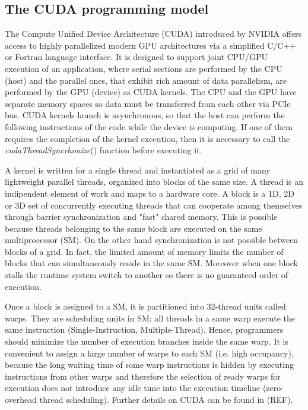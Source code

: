 \documentclass[11pt]{article}
\begin{document}
\subsection{The CUDA programming model}

The Compute Unified Device Architecture (CUDA) introduced by NVIDIA offers access to highly parallelized modern GPU architectures via a simplified C/C++ or Fortran language interface. It is designed to support joint CPU/GPU execution of an application, where serial sections are performed by the CPU (host) and the parallel ones, that exhibit rich amount of data parallelism, are performed by the GPU (device) as CUDA kernels. The CPU and the GPU have separate memory spaces so data must be transferred from each other via PCIe bus. CUDA kernels launch is asynchronous, so that the host can perform the following instructions of the code while the device is computing. If one of them requires the completion of the kernel execution, then it is necessary to call the \textit{cudaThreadSyncrhonize}() function before executing it. 

A kernel is written for a single thread and instantiated as a grid of many lightweight parallel threads, organized into blocks of the same size. 
A thread is an indipendent element of work and maps to a hardware core. A block is a 1D, 2D or 3D set of concurrently executing threads that can cooperate among themselves through barrier synchronization and "fast" shared memory. This is possible because threads belonging to the same block are executed on the same multiprocessor (SM). On the other hand synchronization is not possible between blocks of a grid. In fact, the limited amount of memory limits the number of blocks that can simultaneously reside in the same SM. Moreover when one block stalls the runtime system switch to another so there is no guaranteed order of execution.

Once a block is assigned to a SM, it is partitioned into 32-thread units called warps. They are scheduling units in SM:
all threads in a same warp execute the same instruction (Single-Instruction, Multiple-Thread). Hence, programmers should minimize the number of execution branches inside the same warp. It is convenient to assign a large number of warps to each SM (i.e. high occupancy), because the long waiting time of some warp instructions is hidden by executing instructions from other warps  and therefore the selection of ready warps for execution does not introduce any idle time into the execution timeline (zero-overhead thread scheduling). Further details on CUDA can be found in (REF).
\end{document}
